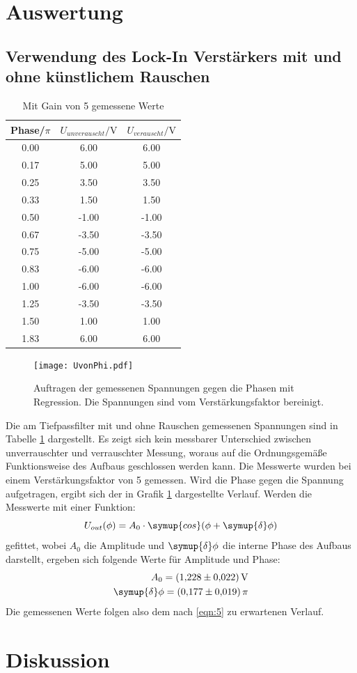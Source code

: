 \section{Auswertung}
\subsection{Verwendung des Lock-In Verstärkers mit und ohne künstlichem Rauschen}
\begin{table}
  \centering
  \caption{Mit Gain von 5 gemessene Werte}
  \label{tab:1}
  \begin{tabular}{c c c}
    \toprule
    Phase/$\si{\pi}$ & $U_{unverauscht}/\si{\volt}$ & $U_{verauscht}/\si{\volt}$ \\
    \midrule
    0.00 & 6.00 & 6.00 \\
    0.17 & 5.00 & 5.00 \\
    0.25 & 3.50 & 3.50 \\
    0.33 & 1.50 & 1.50 \\
    0.50 & -1.00 & -1.00 \\
    0.67 & -3.50 & -3.50 \\
    0.75 & -5.00 & -5.00 \\
    0.83 & -6.00 & -6.00 \\
    1.00 & -6.00 & -6.00 \\
    1.25 & -3.50 & -3.50 \\
    1.50 & 1.00 & 1.00 \\
    1.83 & 6.00 & 6.00 \\
    \bottomrule
  \end{tabular}
\end{table}
\begin{figure}
  \centering
     \texttt{[image: UvonPhi.pdf]}
  \caption{Auftragen der gemessenen Spannungen gegen die Phasen mit Regression. Die Spannungen sind vom Verstärkungsfaktor bereinigt.}
  \label{plot:1}
\end{figure}
Die am Tiefpassfilter mit und ohne Rauschen gemessenen Spannungen sind in Tabelle \ref{tab:1}
dargestellt. Es zeigt sich kein messbarer Unterschied zwischen unverrauschter und verrauschter Messung,
woraus auf die Ordnungsgemäße Funktionsweise des Aufbaus geschlossen werden kann.
Die Messwerte wurden bei einem Verstärkungsfaktor von 5 gemessen. Wird die Phase gegen die Spannung
aufgetragen, ergibt sich der in Grafik \ref{plot:1} dargestellte Verlauf. Werden die Messwerte mit einer
Funktion:
\begin{equation*}
  U_{out}(\phi) = A_0 \cdot \symup{cos}(\phi + \symup{\delta}\phi)
\end{equation*}
gefittet, wobei $A_0$ die Amplitude und $\symup{\delta}\phi$ die interne Phase des Aufbaus darstellt,
ergeben sich folgende Werte für Amplitude und Phase:
\begin{equation*}
  \begin{split}
    A_0 = \SI{1.228(22)}{\volt} \\
    \symup{\delta}\phi = \SI{0.177(19)}{\pi}
  \end{split}
\end{equation*}
Die gemessenen Werte folgen also dem nach \eqref{eqn:5} zu erwartenen Verlauf.

\section{Diskussion}
\newpage
\nocite{*}
\printbibliography
